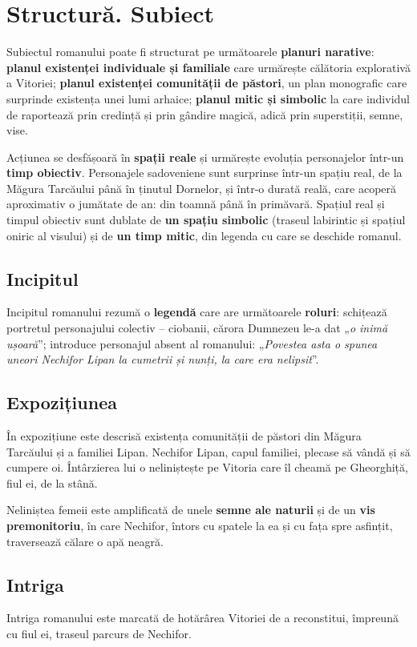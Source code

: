 \documentclass{article}
\newcommand{\qu}[1]{„\emph{#1}”}
\begin{document}
\section{Structură. Subiect}
Subiectul romanului poate fi structurat pe următoarele \textbf{planuri narative}: \textbf{planul existenței individuale și familiale} care urmărește călătoria explorativă a Vitoriei; \textbf{planul existenței comunității de păstori}, un plan monografic care surprinde existența unei lumi arhaice; \textbf{planul mitic și simbolic} la care individul de raportează prin credință și prin gândire magică, adică prin superstiții, semne, vise.

Acțiunea se desfășoară în \textbf{spații reale} și urmărește evoluția personajelor într-un \textbf{timp obiectiv}. Personajele sadoveniene sunt surprinse într-un spațiu real, de la Măgura Tarcăului până în ținutul Dornelor, și într-o durată reală, care acoperă aproximativ o jumătate de an: din toamnă până în primăvară. Spațiul real și timpul obiectiv sunt dublate de \textbf{un spațiu simbolic} (traseul labirintic și spațiul oniric al visului) și de \textbf{un timp mitic}, din legenda cu care se deschide romanul.
\subsection{Incipitul}
Incipitul romanului rezumă o \textbf{legendă} care are următoarele \textbf{roluri}: schițează portretul personajului colectiv -- ciobanii, cărora Dumnezeu le-a dat \qu{o inimă ușoară}; introduce personajul absent al romanului: \qu{Povestea asta o spunea uneori Nechifor Lipan la cumetrii și nunți, la care era nelipsit}.
\subsection{Expozițiunea}
În expozițiune este descrisă existența comunității de păstori din Măgura Tarcăului și a familiei Lipan. Nechifor Lipan, capul familiei, plecase să vândă și să cumpere oi. Întârzierea lui o neliniștește pe Vitoria care îl cheamă pe Gheorghiță, fiul ei, de la stână.

Neliniștea femeii este amplificată de unele \textbf{semne ale naturii} și de un \textbf{vis premonitoriu}, în care Nechifor, întors cu spatele la ea și cu fața spre asfințit, traversează călare o apă neagră.
\subsection{Intriga}
Intriga romanului este marcată de hotărârea Vitoriei de a reconstitui, împreună cu fiul ei, traseul parcurs de Nechifor.
\end{document}

